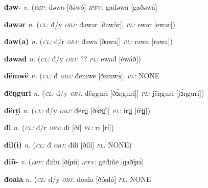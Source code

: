 \newentry
\headword\textbf{đəw-}  
\ipa{[ðəw-]}
\synpos\textit{v.} 
\imperative(\textit {\textsc{imp:}} đəwo [ðə́wó]
\imperfective\textit {\textsc{ipfv:}} gađəwa [gaðəwá]


\newentry
\headword\textbf{đəwər}  
\ipa{[ðəwə́r]}
\synpos\textit{n.} 
\class(\textit{\textsc{cl:}} {đ/y}
\object\textit{\textsc{obj:}} đəwər [ðəwə́r]]
\plural\textit{\textsc{pl:}} ewər [ewər])

\newentry
\headword\textbf{đəw(a)}  
\ipa{[ðəw(a)]}
\synpos\textit{n.} 
\class(\textit{\textsc{cl:}} {đ/r}
\object\textit{\textsc{obj:}} đəwa [ðəwa]]
\plural\textit{\textsc{pl:}} rəwa [rəwa])


\newentry
\headword\textbf{đəwađ}  
\ipa{[ðə́wáð]}
\synpos\textit{n.} 
\class(\textit{\textsc{cl:}} {đ/y}
\object\textit{\textsc{obj:}} ??
\plural\textit{\textsc{pl:}} ewađ [éwáð])

\newentry
\headword\textbf{đëmwë}  
\ipa{[ðɜmwɜ́]}
\synpos\textit{n.} 
\class(\textit{\textsc{cl:}} {đ}
\object\textit{\textsc{obj:}} đëmwë [ðɜmwɜ́]]
\plural\textit{\textsc{pl:}} NONE

\newentry
\headword\textbf{đëŋguri}  
\ipa{[ðɜ́ŋguri]}
\synpos\textit{n.} 
\class(\textit{\textsc{cl:}} {đ/y}
\object\textit{\textsc{obj:}} đëŋguri [ðɜ́ŋguri]]
\plural\textit{\textsc{pl:}} jëŋguri [jɜ́ŋguri])


\newentry
\headword\textbf{đërt̪i}  
\ipa{[ðɜ́ŕt̪í]}
\synpos\textit{n.} 
\class(\textit{\textsc{cl:}} {đ/y}
\object\textit{\textsc{obj:}} đërt̪i [ðɜ́ŕt̪í]]
\plural\textit{\textsc{pl:}} irt̪i [íŕt̪í]) %


\newentry
\headword\textbf{đi}  
\ipa{[ðí]}
\synpos\textit{n.} 
\class(\textit{\textsc{cl:}} {đ/r}
\object\textit{\textsc{obj:}} đi [ðí]
\plural\textit{\textsc{pl:}} ri [rí]) 

\newentry
\headword\textbf{đil(i)}  
\ipa{[ðíl(í)]}
\synpos\textit{n.} 
\class(\textit{\textsc{cl:}} {đ}
\object\textit{\textsc{obj:}} đili [ðílí]
\plural\textit{\textsc{pl:}} NONE)  

\newentry
\headword\textbf{điñ-}  
\ipa{[ðíɲ-]}
\synpos\textit{v.} 
\imperative(\textit {\textsc{imp:}} điñu [ðíɲú]
\imperfective\textit {\textsc{ipfv:}} gëđiñë [ɡɜðíɲɜ́]

\newentry
\headword\textbf{đoala}  
\ipa{[ðóalá]}
\synpos\textit{n.} 
\class(\textit{\textsc{cl:}} {đ/y}
\object\textit{\textsc{obj:}} đoala [ðóalá]
\plural\textit{\textsc{pl:}} NONE

